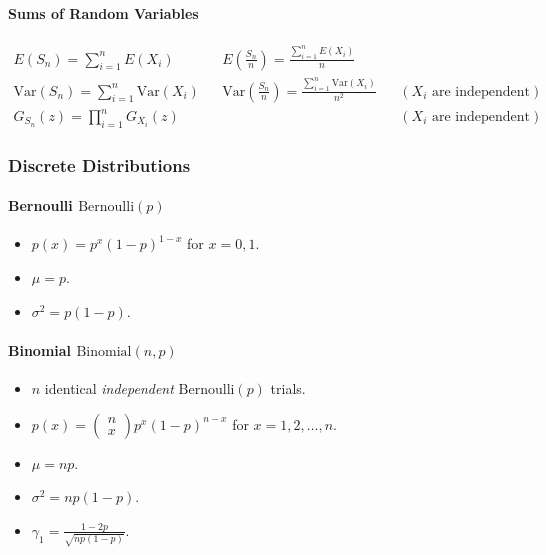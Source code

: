 \documentclass[twocolumn,english]{article}
\begin{document}
\paragraph{Sums of Random Variables}

\begin{align*}
E\left(S_{n}\right)=\sum_{i=1}^{n}E\left(X_{i}\right) &  & E\left(\frac{S_{n}}{n}\right)=\frac{\sum_{i=1}^{n}E\left(X_{i}\right)}{n}\\
\text{Var}\left(S_{n}\right)=\sum_{i=1}^{n}\text{Var}\left(X_{i}\right) &  & \text{Var}\left(\frac{S_{n}}{n}\right)=\frac{\sum_{i=1}^{n}\text{Var}\left(X_{i}\right)}{n^{2}} &  & \left(X_{i}\text{ are independent}\right)\\
G_{S_{n}}\left(z\right)=\prod_{i=1}^{n}G_{X_{i}}\left(z\right) &  &  &  & \left(X_{i}\text{ are independent}\right)
\end{align*}

\subsubsection{Discrete Distributions}

\paragraph{Bernoulli $\text{Bernoulli}\left(p\right)$}
\begin{itemize}
\item $p\left(x\right)=p^{x}\left(1-p\right)^{1-x}$ for $x=0,1$.
\item $\mu=p$.
\item $\sigma^{2}=p\left(1-p\right)$.
\end{itemize}

\paragraph{Binomial $\text{Binomial}\left(n,p\right)$}
\begin{itemize}
\item $n$ identical \emph{independent} $\text{Bernoulli}\left(p\right)$
trials.
\item $p\left(x\right)=\left(\begin{array}{c}
n\\
x
\end{array}\right)p^{x}\left(1-p\right)^{n-x}$ for $x=1,2,\dots,n$.
\item $\mu=np$.
\item $\sigma^{2}=np\left(1-p\right)$.
\item $\gamma_{1}=\frac{1-2p}{\sqrt{np\left(1-p\right)}}$.
\end{itemize}
\end{document}
